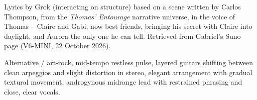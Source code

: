 
\label{sec:well-meaning-conspiracies}
\begin{notes}
Lyrics by Grok (interacting on structure) based on a scene written by Carlos Thompson, from the \emph{Thomas' Entourage} narrative universe, in the voice of Thomas -- Claire and Gabi, now best friends, bringing his secret with Claire into daylight, and Aurora the only one he can tell. Retrieved from Gabriel's Suno page (V6-MINI, 22 October 2026).
\end{notes}
\begin{style}
Alternative / art-rock, mid-tempo restless pulse, layered guitars shifting between clean arpeggios and slight distortion in stereo, elegant arrangement with gradual textural movement, androgynous midrange lead with restrained phrasing and close, clear vocals.
\end{style}
